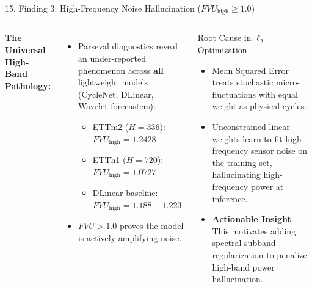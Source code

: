 \documentclass[aspectratio=169, 10pt]{beamer}
\begin{document}
\begin{frame}{15. Finding 3: High-Frequency Noise Hallucination ($FVU_{\text{high}} \ge 1.0$)}
\begin{columns}[T]
\textbf{The Universal High-Band Pathology:}
\begin{itemize}
    \item Parseval diagnostics reveal an under-reported phenomenon across \textbf{all} lightweight models (CycleNet, DLinear, Wavelet forecasters):
    \begin{itemize}
        \item ETTm2 ($H=336$): $FVU_{\text{high}} = \mathbf{1.2428}$
        \item ETTh1 ($H=720$): $FVU_{\text{high}} = \mathbf{1.0727}$
        \item DLinear baseline: $FVU_{\text{high}} = 1.188 - 1.223$
    \end{itemize}
    \item $FVU > 1.0$ proves the model is actively amplifying noise.
\end{itemize}

\begin{alertblock}{Root Cause in $\ell_2$ Optimization}
\begin{itemize}
    \item Mean Squared Error treats stochastic micro-fluctuations with equal weight as physical cycles.
    \item Unconstrained linear weights learn to fit high-frequency sensor noise on the training set, hallucinating high-frequency power at inference.
    \item \textbf{Actionable Insight}: This motivates adding spectral subband regularization to penalize high-band power hallucination.
\end{itemize}
\end{alertblock}
\end{columns}
\end{frame}
\end{document}
